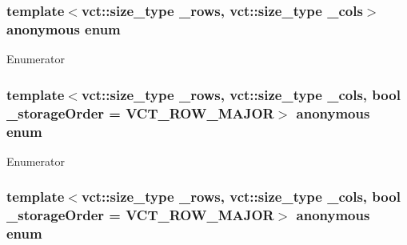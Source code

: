 \hypertarget{group__cisst_numerical_gaabcc7c5a87deb51721aaa57338bb0324}{}\subsubsection[{anonymous enum}]{\setlength{\rightskip}{0pt plus 5cm}template$<$vct\+::size\+\_\+type \+\_\+rows, vct\+::size\+\_\+type \+\_\+cols$>$ anonymous enum}\label{group__cisst_numerical_gaabcc7c5a87deb51721aaa57338bb0324}
\begin{Desc}
\item[Enumerator]\par
\begin{description}
\item[{\em 
\hypertarget{group__cisst_numerical_ggaabcc7c5a87deb51721aaa57338bb0324aa5d1ce549243ebe74888a9a9ede21944}{}M\+I\+N\+\_\+\+M\+N\label{group__cisst_numerical_ggaabcc7c5a87deb51721aaa57338bb0324aa5d1ce549243ebe74888a9a9ede21944}
}]\end{description}
\end{Desc}
\hypertarget{group__cisst_numerical_ga01f94ce395a488371c8c33cd8378caa8}{}\subsubsection[{anonymous enum}]{\setlength{\rightskip}{0pt plus 5cm}template$<$vct\+::size\+\_\+type \+\_\+rows, vct\+::size\+\_\+type \+\_\+cols, bool \+\_\+storage\+Order = V\+C\+T\+\_\+\+R\+O\+W\+\_\+\+M\+A\+J\+O\+R$>$ anonymous enum}\label{group__cisst_numerical_ga01f94ce395a488371c8c33cd8378caa8}
\begin{Desc}
\item[Enumerator]\par
\begin{description}
\item[{\em 
\hypertarget{group__cisst_numerical_gga01f94ce395a488371c8c33cd8378caa8ac4be81b1cc6f6d12232a22300cc4c180}{}M\label{group__cisst_numerical_gga01f94ce395a488371c8c33cd8378caa8ac4be81b1cc6f6d12232a22300cc4c180}
}]\end{description}
\end{Desc}
\hypertarget{group__cisst_numerical_ga4b329a4e5f612430051b43225bd23a1b}{}\subsubsection[{anonymous enum}]{\setlength{\rightskip}{0pt plus 5cm}template$<$vct\+::size\+\_\+type \+\_\+rows, vct\+::size\+\_\+type \+\_\+cols, bool \+\_\+storage\+Order = V\+C\+T\+\_\+\+R\+O\+W\+\_\+\+M\+A\+J\+O\+R$>$ anonymous enum}\label{group__cisst_numerical_ga4b329a4e5f612430051b43225bd23a1b}
